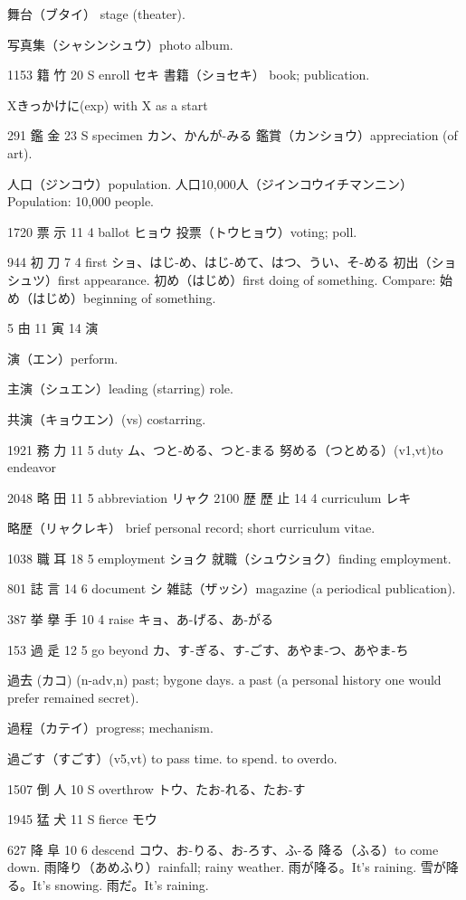 舞台（ブタイ）
stage (theater).

写真集（シャシンシュウ）photo album.

1153	籍		竹	20	S		enroll	セキ
書籍（ショセキ）
book; publication.

Xきっかけに(exp) with X as a start

291	鑑		金	23	S		specimen	カン、かんが-みる
鑑賞（カンショウ）appreciation (of art).

人口（ジンコウ）population.
人口10,000人（ジインコウイチマンニン）
Population: 10,000 people.

1720	票		示	11	4		ballot	ヒョウ
投票（トウヒョウ）voting; poll.

944	初		刀	7	4		first	ショ、はじ-め、はじ-めて、はつ、うい、そ-める
初出（ショシュツ）first appearance.
初め（はじめ）first doing of something.
Compare: 始め（はじめ）beginning of something.

5 由 11 寅 14 演

演（エン）perform.

主演（シュエン）leading (starring) role.

共演（キョウエン）(vs) costarring.

1921	務		力	11	5		duty	ム、つと-める、つと-まる
努める（つとめる）(v1,vt)to endeavor

2048	略		田	11	5		abbreviation	リャク
2100	歴	歷	止	14	4		curriculum	レキ

略歴（リャクレキ）
brief personal record;
short curriculum vitae.

1038	職		耳	18	5		employment	ショク
就職（シュウショク）finding employment.

801	誌		言	14	6		document	シ
雑誌（ザッシ）magazine (a periodical publication).

387	挙	擧	手	10	4		raise	キョ、あ-げる、あ-がる

153	過		辵	12	5		go beyond	カ、す-ぎる、す-ごす、あやま-つ、あやま-ち

過去 (カコ) (n-adv,n)
past; bygone days.
a past (a personal history one would prefer remained secret).

過程（カテイ）progress; mechanism.

過ごす（すごす）(v5,vt) to pass time. to spend. to overdo.

1507	倒		人	10	S		overthrow	トウ、たお-れる、たお-す

1945	猛		犬	11	S		fierce	モウ

627	降		阜	10	6		descend	コウ、お-りる、お-ろす、ふ-る
降る（ふる）to come down.
雨降り（あめふり）rainfall; rainy weather.
雨が降る。It's raining.
雪が降る。It's snowing.
雨だ。It's raining.

